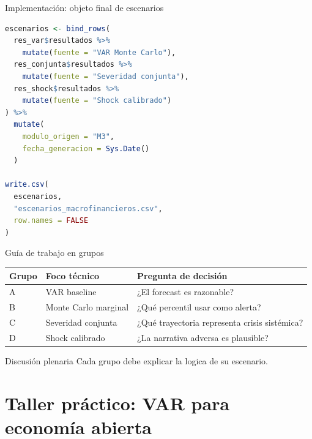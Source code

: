\documentclass[10pt,aspectratio=169]{beamer}
\begin{document}
\begin{frame}[fragile]{Implementación: objeto final de escenarios}
\begin{lstlisting}[language=R,basicstyle=\ttfamily\scriptsize]
escenarios <- bind_rows(
  res_var$resultados %>%
    mutate(fuente = "VAR Monte Carlo"),
  res_conjunta$resultados %>%
    mutate(fuente = "Severidad conjunta"),
  res_shock$resultados %>%
    mutate(fuente = "Shock calibrado")
) %>%
  mutate(
    modulo_origen = "M3",
    fecha_generacion = Sys.Date()
  )

write.csv(
  escenarios,
  "escenarios_macrofinancieros.csv",
  row.names = FALSE
)
\end{lstlisting}
\end{frame}

\begin{frame}{Guía de trabajo en grupos}
\begin{table}
\small
\begin{tabular}{p{2.7cm}p{4.2cm}p{4.2cm}}
\toprule
Grupo & Foco técnico & Pregunta de decisión \\
\midrule
A & VAR baseline & ¿El forecast es razonable? \\
B & Monte Carlo marginal & ¿Qué percentil usar como alerta? \\
C & Severidad conjunta & ¿Qué trayectoria representa crisis sistémica? \\
D & Shock calibrado & ¿La narrativa adversa es plausible? \\
\bottomrule
\end{tabular}
\end{table}

\begin{block}{Discusión plenaria}
Cada grupo debe explicar la logica de su escenario.
\end{block}
\end{frame}

\section{Taller práctico: VAR para economía abierta}
\end{document}
